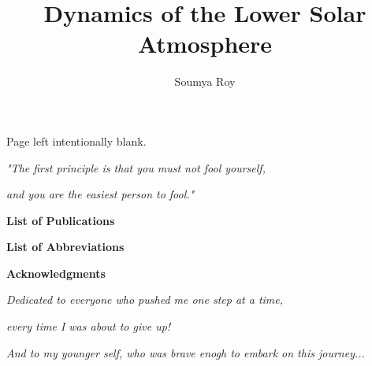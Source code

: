 \documentclass[keepsake]{hvdthesis}
\author{Soumya Roy}
\title{Dynamics of the Lower Solar Atmosphere}
\begin{document}


\clearpage
\thispagestyle{empty}
\begin{center}
\vspace*{\fill}
Page left intentionally blank.
\vspace*{\fill}
\end{center}

\frontmatter

\makecover

\newpage

\thispagestyle{plain}
{\centerline {\em "The first principle is that you must not fool yourself, }}
{\centerline {\em and you are the easiest person to fool."}}
{}

\newpage

%
{\singlespace
\tableofcontents
}
\newpage
\clearpage

\listoffigures
\newpage
\listoftables

\newpage
\clearpage

\thispagestyle{plain}
\vskip 0.5cm
{\centerline {\Large \bf List of Publications}}
\vskip 0.5cm
\normalsize



\newpage
\clearpage

\thispagestyle{plain}
\vskip 0.5cm
{\centerline {\Large \bf List of Abbreviations}}
\vskip 0.5cm
\normalsize



\newpage
\clearpage
%
\thispagestyle{plain}

\vskip 0.5cm
{\centerline {\Large \bf Acknowledgments}}
\vskip 0.5cm
\normalsize




\newpage
\clearpage
%
\thispagestyle{plain}

\vspace*{\fill}
{\centerline {\em Dedicated to everyone who pushed me one step at a time,}} 
{\centerline {\em every time I was about to give up!}}
{\centerline {\em And to my younger self, who was brave enogh to embark on this journey...}}
\vspace*{\fill}
\end{document}
